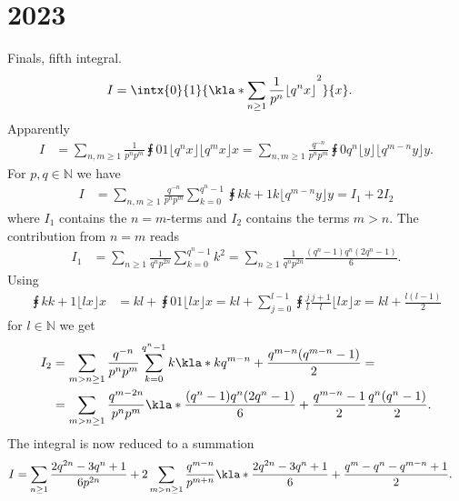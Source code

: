 \documentclass[english, parskip=full]{scrartcl}
\title{\titel}
\author{\autor}
\date{\today}
\begin{document}
\maketitle  %

\section*{2023}
Finals, fifth integral.
\begin{align}
I &= \intx{0}{1}{\kla*{\sum_{n\ge 1} \frac{1}{p^n} \lfloor q^n x \rfloor }^2}{x}.
\end{align}
Apparently
\begin{align}
I &= \sum_{n,m \ge 1} \frac{1}{p^np^m} \intx{0}{1}{\lfloor q^nx \rfloor \lfloor q^mx \rfloor}{x} = \sum_{n,m \ge 1} \frac{q^{-n}}{p^np^m} \intx{0}{q^n}{\lfloor y \rfloor \lfloor q^{m-n}y \rfloor}{y}.
\end{align}
For $p,q\in\mathbb{N}$ we have
\begin{align}
I &= \sum_{n,m \ge 1} \frac{q^{-n}}{p^np^m} \sum_{k=0}^{q^n-1} \intx{k}{k+1}{k \lfloor q^{m-n}y \rfloor}{y} = I_1 + 2I_2
\end{align}
where $I_1$ contains the $n=m$-terms and $I_2$ contains the terms $m>n$.
The contribution from $n=m$ reads
\begin{align}
I_1 &= \sum_{n\ge 1} \frac{1}{q^np^{2n}} \sum_{k=0}^{q^n-1} k^2 = \sum_{n\ge 1} \frac{1}{q^np^{2n}} \frac{(q^n-1)q^n(2q^n - 1)}{6}.
\end{align}
Using
\begin{align}
\intx{k}{k+1}{\lfloor lx \rfloor }{x} &= kl + \intx{0}{1}{\lfloor lx \rfloor }{x} = kl + \sum_{j=0}^{l-1} \intx{\frac{j}{l}}{\frac{j+1}{l}}{\lfloor lx \rfloor }{x} = kl + \frac{l(l-1)}{2}
\end{align}
for $l\in\mathbb{N}$ we get
\begin{align}
I_2 &= \sum_{m>n \ge 1} \frac{q^{-n}}{p^np^m} \sum_{k=0}^{q^n-1} k \kla*{kq^{m-n} + \frac{q^{m-n} (q^{m-n} - 1)}{2}  } = \\
&= \sum_{m>n \ge 1} \frac{q^{m-2n}}{p^np^m} \kla*{ \frac{(q^n-1) q^n (2q^n - 1)}{6} + \frac{q^{m-n}-1}{2} \frac{q^n(q^n-1)}{2} }.
\end{align}
The integral is now reduced to a summation
\begin{align}
I &= \sum_{n\ge 1} \frac{2q^{2n} - 3q^n + 1 }{6p^{2n}} + 2\sum_{m>n\ge 1} \frac{q^{m-n}}{p^{m+n}} \kla*{\frac{2q^{2n} - 3q^n + 1}{6} + \frac{q^m - q^n - q^{m-n} + 1}{2} }.  
\end{align}
\end{document}
